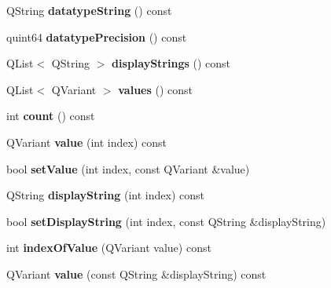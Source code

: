 \begin{DoxyCompactItemize}
Q\+String {\bfseries datatype\+String} () const
\item 
\mbox{\label{class_name_value_list_a5d9d1009fe7f2b525cd95aadc6b4f87e}} 
quint64 {\bfseries datatype\+Precision} () const
\item 
\mbox{\label{class_name_value_list_aee16a59c70b06d415bba5de5bb6c2029}} 
Q\+List$<$ Q\+String $>$ {\bfseries display\+Strings} () const
\item 
\mbox{\label{class_name_value_list_a70b2e808198633fb8506738296b428cf}} 
Q\+List$<$ Q\+Variant $>$ {\bfseries values} () const
\item 
\mbox{\label{class_name_value_list_a0fe7deda090798e9f75917ed0383df71}} 
int {\bfseries count} () const
\item 
\mbox{\label{class_name_value_list_acfb2dce8a6426fd0b0bf0ba83d503eea}} 
Q\+Variant {\bfseries value} (int index) const
\item 
\mbox{\label{class_name_value_list_a706852047fdbda8d1013666d4286fb0b}} 
bool {\bfseries set\+Value} (int index, const Q\+Variant \&value)
\item 
\mbox{\label{class_name_value_list_aa6fd21bb939ae664ba0992b26761b7a4}} 
Q\+String {\bfseries display\+String} (int index) const
\item 
\mbox{\label{class_name_value_list_a89be3e442e5f729389fb1d9011f39cec}} 
bool {\bfseries set\+Display\+String} (int index, const Q\+String \&display\+String)
\item 
\mbox{\label{class_name_value_list_aafac58988ea823f071b253e143955904}} 
int {\bfseries index\+Of\+Value} (Q\+Variant value) const
\item 
\mbox{\label{class_name_value_list_a49253708b64dd590f7bbe62ca7b390c9}} 
Q\+Variant {\bfseries value} (const Q\+String \&display\+String) const
\item 
\mbox{\label{class_name_value_list_add8ac938911bd858af18a3c53b401e25}} 

\end{DoxyCompactItemize}
